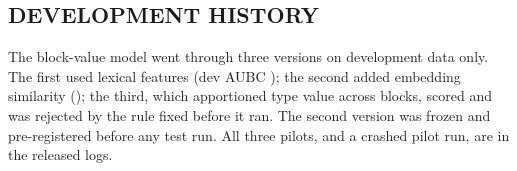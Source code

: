 \ifdefined\IEEEaccessbuild\else
\subsection{DEVELOPMENT HISTORY}
The block-value model went through three versions on development data only. The first used lexical features (dev AUBC
\RDevAubcOne); the second added embedding similarity (\RDevAubcTwo); the third, which apportioned type value across
blocks, scored \RDevAubcThree and was rejected by the rule fixed before it ran. The second version was frozen and
pre-registered before any test run. All three pilots, and a crashed pilot run, are in the released logs.
\fi
